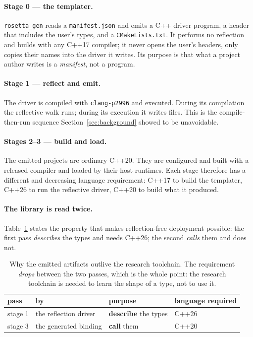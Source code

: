 \documentclass[11pt,a4paper]{article}
\newcommand{\code}[1]{\texttt{\small #1}}
\begin{document}
\paragraph{Stage 0 --- the templater.}
\code{rosetta\_gen} reads a \code{manifest.json} and emits a C++ driver program,
a header that includes the user's types, and a \code{CMakeLists.txt}. It
performs no reflection and builds with any C++17 compiler; it never opens
the user's headers, only copies their names into the driver it writes. Its
purpose is that what a project author writes is a \emph{manifest}, not a
program.

\paragraph{Stage 1 --- reflect and emit.}
The driver is compiled with \code{clang-p2996} and executed. During its
compilation the reflective walk runs; during its execution it writes files.
This is the compile-then-run sequence Section~\ref{sec:background} showed to be
unavoidable.

\paragraph{Stages 2--3 --- build and load.}
The emitted projects are ordinary C++20. They are configured and built with a
released compiler and loaded by their host runtimes. Each stage therefore has a
different and decreasing language requirement: C++17 to build the templater,
C++26 to run the reflective driver, C++20 to build what it produced.

\paragraph{The library is read twice.}
Table~\ref{tab:twice} states the property that makes reflection-free deployment
possible: the first pass \emph{describes} the types and needs C++26; the second
\emph{calls} them and does not.

\begin{table}[h]
\centering\small
\begin{tabular}{llll}
\toprule
pass & by & purpose & language required \\
\midrule
stage 1 & the reflection driver & \textbf{describe} the types & C++26 \\
stage 3 & the generated binding & \textbf{call} them & C++20 \\
\bottomrule
\end{tabular}
\caption{Why the emitted artifacts outlive the research toolchain. The
requirement \emph{drops} between the two passes, which is the whole point: the
research toolchain is needed to learn the shape of a type, not to use it.}
\label{tab:twice}
\end{table}
\end{document}

